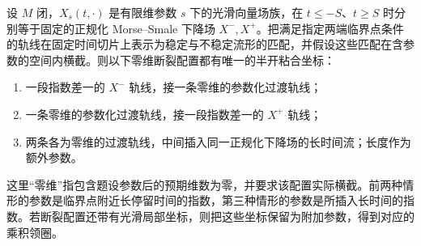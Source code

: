 \begin{lemma}\label{g2:lem:parametric-tail-gluing}
	设 \(M\) 闭，\(X_s(t,\cdot)\) 是有限维参数 \(s\) 下的光滑向量场族，在 \(t\le-S\)、\(t\ge S\) 时分别等于固定的正规化 Morse--Smale 下降场 \(X^-,X^+\)。把满足指定两端临界点条件的轨线在固定时间切片上表示为稳定与不稳定流形的匹配，并假设这些匹配在含参数的空间内横截。则以下零维断裂配置都有唯一的半开粘合坐标：
	\begin{enumerate}
		\item 一段指数差一的 \(X^-\) 轨线，接一条零维的参数化过渡轨线；
		\item 一条零维的参数化过渡轨线，接一段指数差一的 \(X^+\) 轨线；
		\item 两条各为零维的过渡轨线，中间插入同一正规化下降场的长时间流；长度作为额外参数。
	\end{enumerate}
	这里“零维”指包含题设参数后的预期维数为零，并要求该配置实际横截。前两种情形的参数是临界点附近长停留时间的指数，第三种情形的参数是所插入长时间的指数。若断裂配置还带有光滑局部坐标，则把这些坐标保留为附加参数，得到对应的乘积领圈。
\end{lemma}
